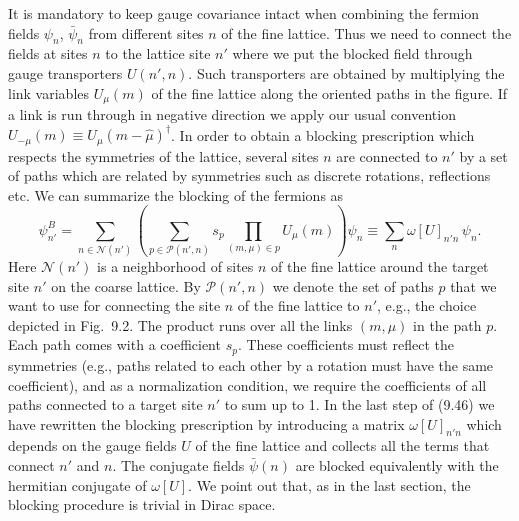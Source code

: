 It is mandatory to keep gauge covariance intact when combining the fermion
fields $\psi_n$, $\bar\psi_n$ from different sites $n$ of the fine lattice.
Thus we need to connect the fields at sites $n$ to the lattice site $n'$ where
we put the blocked field through gauge transporters $U(n',n)$. Such
transporters are obtained by multiplying the link variables $U_\mu(m)$ of the
fine lattice along the oriented paths in the figure. If a link is run through
in negative direction we apply our usual convention $U_{-\mu}(m) \equiv
U_\mu(m-\hat\mu)^\dagger$. In order to obtain a blocking prescription which
respects the symmetries of the lattice, several sites $n$ are connected to
$n'$ by a set of paths which are related by symmetries such as discrete
rotations, reflections etc. We can summarize the blocking of the fermions as
\begin{equation}
  \psi^B_{n'} = \sum_{n\in\mathcal{N}(n')}
    \left(\sum_{p\in\mathcal{P}(n',n)}s_p\prod_{(m,\mu)\in p}U_\mu(m)\right)\psi_n
  \equiv \sum_n\omega[U]_{n'n}\,\psi_n .
\end{equation}
Here $\mathcal{N}(n')$ is a neighborhood of sites $n$ of the fine lattice
around the target site $n'$ on the coarse lattice. By $\mathcal{P}(n',n)$ we
denote the set of paths $p$ that we want to use for connecting the site $n$ of
the fine lattice to $n'$, e.g., the choice depicted in Fig.~9.2. The product
runs over all the links $(m,\mu)$ in the path $p$. Each path comes with a
coefficient $s_p$. These coefficients must reflect the symmetries (e.g., paths
related to each other by a rotation must have the same coefficient), and as a
normalization condition, we require the coefficients of all paths connected to
a target site $n'$ to sum up to 1. In the last step of (9.46) we have
rewritten the blocking prescription by introducing a matrix $\omega[U]_{n'n}$
which depends on the gauge fields $U$ of the fine lattice and collects all the
terms that connect $n'$ and $n$. The conjugate fields $\bar\psi(n)$ are
blocked equivalently with the hermitian conjugate of $\omega[U]$. We point out
that, as in the last section, the blocking procedure is trivial in Dirac space.

